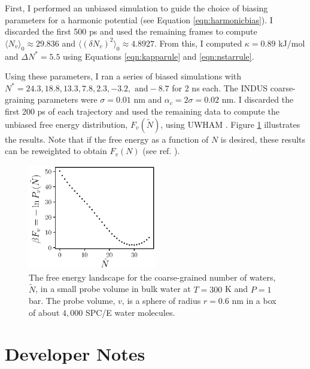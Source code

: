 \documentclass[11pt,notitlepage]{article}
\begin{document}
First, I performed an unbiased simulation to guide the choice of biasing parameters for a harmonic potential (see Equation \ref{eqn:harmonicbias}). I discarded the first 500 ps and used the remaining frames to compute $\langle N_v \rangle_0 \approx 29.836$ and $\langle (\delta N_v)^2 \rangle_0 \approx 4.8927$. From this, I computed $\kappa = 0.89$ kJ/mol and $\Delta N^* = 5.5$ using Equations \ref{eqn:kapparule} and \ref{eqn:nstarrule}. 

Using these parameters, I ran a series of biased simulations with $N^* = 24.3, 18.8, 13.3, 7.8, 2.3, -3.2, \text{ and} -8.7$ for 2 ns each. The INDUS coarse-graining parameters were $\sigma = 0.01$ nm and $\alpha_c = 2 \sigma = 0.02$ nm. I discarded the first 200 ps of each trajectory and used the remaining data to compute the unbiased free energy distribution, $F_v( \tilde{N} )$, using UWHAM \cite{Tan2012}. Figure \ref{fig:fvn_bulk} illustrates the results. Note that if the free energy as a function of $N$ is desired, these results can be reweighted to obtain $F_v(N)$ (see ref. \cite{Patel2010}).


\begin{figure}
	\label{fig:fvn_bulk}
	\centering
	\includegraphics[width=0.5\textwidth]{examples/bulk_water/plot_F_v_Ntilde_WHAM.eps}
	\captionsetup{width=0.8\linewidth}
	\caption{\label{fig:fvn_bulk}The free energy landscape for the coarse-grained number of waters, $\tilde{N}$, in a small probe volume in bulk water at $T = 300$ K and $P = 1$ bar. The probe volume, $v$, is a sphere of radius $r = 0.6$ nm in a box of about $4,000$ SPC/E water molecules.}
\end{figure}



\section{Developer Notes}
\end{document}

